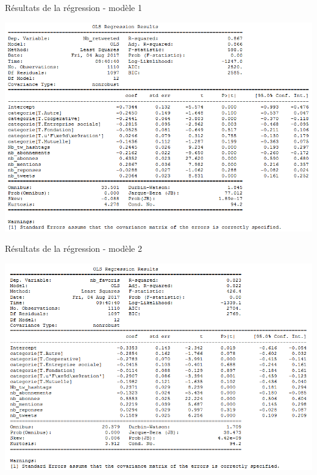         \begin{table}
        \caption{Résultats de la régression - modèle 1}
        \label{table:13regress1}
            \includegraphics[width = \linewidth]{fig/tbl_regress1.png}
        \end{table}

        \begin{table}
        \caption{Résultats de la régression - modèle 2}
        \label{table:13regress2}
            \includegraphics[width = \linewidth]{fig/tbl_regress2.png}
        \end{table}


